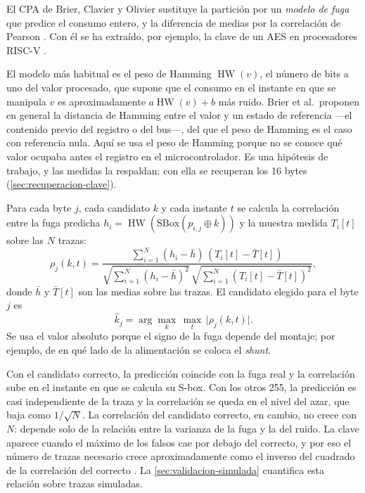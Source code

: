 El CPA de Brier, Clavier y Olivier \cite{brier2004cpa} sustituye la partición
por un \emph{modelo de fuga} que predice el consumo entero, y la diferencia de
medias por la correlación de Pearson
\cite[sec.~II.B.3]{mishra2025modern}. Con él se ha extraído, por ejemplo, la
clave de un AES en procesadores RISC-V \cite[sec.~IV.B]{mishra2025modern}.

El modelo más habitual es el peso de Hamming $\operatorname{HW}(v)$, el número
de bits a uno del valor procesado, que supone que el consumo en el instante en
que se manipula $v$ es aproximadamente $a \operatorname{HW}(v) + b$ más ruido.
Brier et al.\ proponen en general la distancia de Hamming entre el valor y un
estado de referencia ---el contenido previo del registro o del bus---, del que
el peso de Hamming es el caso con referencia nula. Aquí se usa el peso de
Hamming porque no se conoce qué valor ocupaba antes el registro en el
microcontrolador. Es una hipótesis de trabajo, y las medidas la respaldan: con
ella se recuperan los 16 bytes (\cref{sec:recuperacion-clave}).

Para cada byte $j$, cada candidato $k$ y cada instante $t$ se calcula la
correlación entre la fuga predicha $h_i = \operatorname{HW}(\mathrm{SBox}(p_{i,j}
\oplus k))$ y la muestra medida $T_i[t]$ sobre las $N$ trazas:
\begin{equation}
  \rho_j(k, t) =
  \frac{\sum_{i=1}^{N} (h_i - \bar h)\,(T_i[t] - \bar T[t])}
       {\sqrt{\sum_{i=1}^{N} (h_i - \bar h)^2}\,\sqrt{\sum_{i=1}^{N} (T_i[t] - \bar T[t])^2}},
  \label{eq:cpa}
\end{equation}
donde $\bar h$ y $\bar T[t]$ son las medias sobre las trazas. El candidato
elegido para el byte $j$ es
\begin{equation}
  \hat k_j = \arg\max_{k} \, \max_{t} \, \lvert \rho_j(k, t) \rvert .
  \label{eq:cpa-decision}
\end{equation}
Se usa el valor absoluto porque el signo de la fuga depende del montaje; por
ejemplo, de en qué lado de la alimentación se coloca el \emph{shunt}.

Con el candidato correcto, la predicción coincide con la fuga real y la
correlación sube en el instante en que se calcula su S-box. Con los otros 255,
la predicción es casi independiente de la traza y la correlación se queda en el
nivel del azar, que baja como $1/\sqrt{N}$. La correlación del candidato
correcto, en cambio, no crece con $N$: depende solo de la relación entre la
varianza de la fuga y la del ruido. La clave aparece cuando el máximo de los
falsos cae por debajo del correcto, y por eso el número de trazas necesario
crece aproximadamente como el inverso del cuadrado de la correlación del
correcto \cite[cap.~6]{mangard2007power}. La \cref{sec:validacion-simulada}
cuantifica esta relación sobre trazas simuladas.

